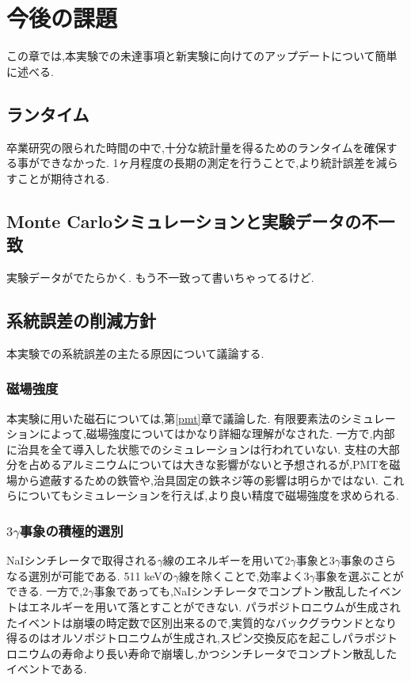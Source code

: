 \chapter{今後の課題}\label{prospect}

この章では,本実験での未達事項と新実験に向けてのアップデートについて簡単に述べる.

\section{ランタイム}
卒業研究の限られた時間の中で,十分な統計量を得るためのランタイムを確保する事ができなかった.
1ヶ月程度の長期の測定を行うことで,より統計誤差を減らすことが期待される.

\section{Monte Carloシミュレーションと実験データの不一致}
実験データがでたらかく.
もう不一致って書いちゃってるけど.

\section{系統誤差の削減方針}
本実験での系統誤差の主たる原因について議論する.

\subsection{磁場強度}
本実験に用いた磁石については,第\ref{pmt}章で議論した.
有限要素法のシミュレーションによって,磁場強度についてはかなり詳細な理解がなされた.
一方で,内部に治具を全て導入した状態でのシミュレーションは行われていない.
支柱の大部分を占めるアルミニウムについては大きな影響がないと予想されるが,PMTを磁場から遮蔽するための鉄管や,治具固定の鉄ネジ等の影響は明らかではない.
これらについてもシミュレーションを行えば,より良い精度で磁場強度を求められる.

\subsection{$3\gamma$事象の積極的選別}
NaIシンチレータで取得される$\gamma$線のエネルギーを用いて$2\gamma$事象と$3\gamma$事象のさらなる選別が可能である.
511 keVの$\gamma$線を除くことで,効率よく$3\gamma$事象を選ぶことができる.
一方で,$2\gamma$事象であっても,NaIシンチレータでコンプトン散乱したイベントはエネルギーを用いて落とすことができない.
パラポジトロニウムが生成されたイベントは崩壊の時定数で区別出来るので,実質的なバックグラウンドとなり得るのはオルソポジトロニウムが生成され,スピン交換反応を起こしパラポジトロニウムの寿命より長い寿命で崩壊し,かつシンチレータでコンプトン散乱したイベントである.


